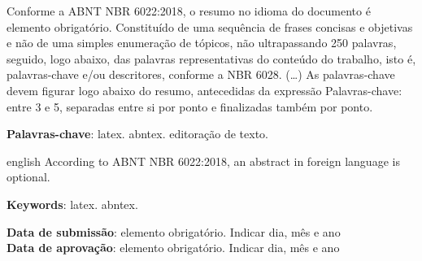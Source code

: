 \begin{resumoumacoluna}
    Conforme a ABNT NBR 6022:2018, o resumo no idioma do documento é elemento obrigatório. Constituído de uma sequência de frases concisas e objetivas e não de uma simples enumeração de tópicos, não ultrapassando 250 palavras, seguido, logo abaixo, das palavras representativas do conteúdo do trabalho, isto é, palavras-chave e/ou descritores, conforme a NBR 6028. (\ldots) As palavras-chave devem figurar logo abaixo do resumo, antecedidas da expressão Palavras-chave: entre 3 e 5, separadas entre si por ponto e finalizadas também por ponto.
   
    \vspace{\onelineskip}
    
    \noindent
    \textbf{Palavras-chave}: latex. abntex. editoração de texto.
\end{resumoumacoluna}


\renewcommand{\resumoname}{Abstract}
\begin{resumoumacoluna}
\begin{otherlanguage*}{english}
    According to ABNT NBR 6022:2018, an abstract in foreign language is optional.

    \vspace{\onelineskip}

    \noindent
    \textbf{Keywords}: latex. abntex.
\end{otherlanguage*}  
\end{resumoumacoluna}


\begin{center}\smaller
    \textbf{Data de submissão}: elemento obrigatório. Indicar dia, mês e ano \\
    \textbf{Data de aprovação}: elemento obrigatório. Indicar dia, mês e ano
\end{center}